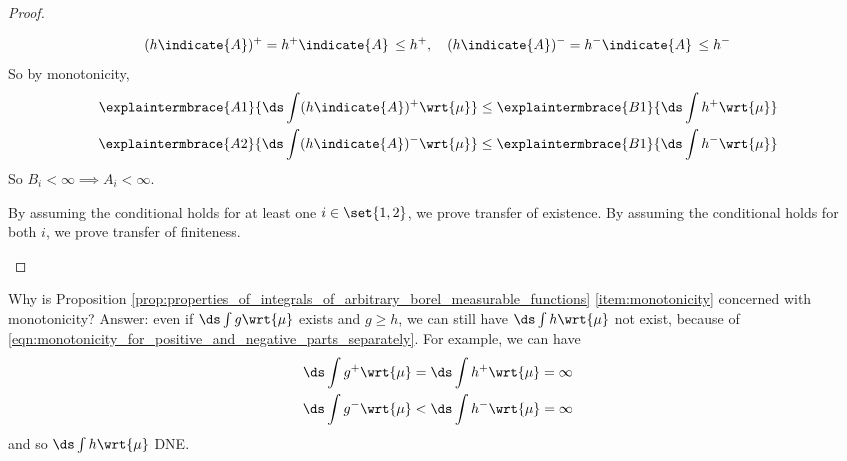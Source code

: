 \documentclass{article} %
\begin{document}
\begin{proof}
\begin{alphabate}
\begin{itemize}
\end{itemize}

\item 
\[ (h \indicate{A})^+ = h^+\indicate{A} \, \leq h^+, \quad  (h \indicate{A})^- = h^- \indicate{A}  \, \leq h^- \]
So by monotonicity,
\begin{align*}
\explaintermbrace{A1}{\ds\int (h \indicate{A})^+ \wrt{\mu}} \leq \explaintermbrace{B1}{\ds\int h^+ \wrt{\mu}} \\
\explaintermbrace{A2}{\ds\int (h \indicate{A})^- \wrt{\mu}} \leq \explaintermbrace{B1}{\ds\int h^- \wrt{\mu}} \\
\end{align*}
So $B_i < \infty \implies A_i < \infty$.

By assuming the conditional holds for at least one $i \in \set{1,2}$, we prove transfer of existence. By assuming the conditional holds for both $i$, we prove transfer of finiteness. 

\end{alphabate}
\end{proof}




\begin{remark}{}
Why is Proposition \ref{prop:properties_of_integrals_of_arbitrary_borel_measurable_functions} \ref{item:monotonicity} concerned with monotonicity? Answer: even if $\ds\int g \wrt{\mu}$ exists and $g \geq h$, we can still have $\ds\int h \wrt{\mu}$ not exist, because of \eqref{eqn:monotonicity_for_positive_and_negative_parts_separately}.  For example, we can have 
\begin{align}
\ds\int g^+ \wrt{\mu} &= \ds\int h^+ \wrt{\mu} = \infty  \\
\ds\int g^- \wrt{\mu} & < \ds\int h^- \wrt{\mu} = \infty 	
\end{align}
and so $\ds\int h \wrt{\mu}$ DNE.
\label{rk:why_does_existence_matter_for_monotonicity}
\end{remark}
\end{document}

